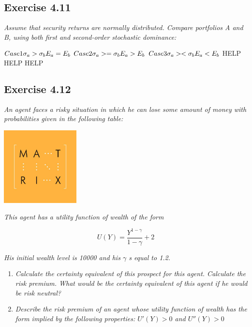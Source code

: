 \documentclass[]{book}
\theoremstyle{definition}
\theoremstyle{definition}
\theoremstyle{remark}
\begin{document}
\subsection{Exercise 4.11}\label{exercise-4.11}

\emph{Assume that security returns are normally distributed. Compare
portfolios A and B, using both first and second-order stochastic
dominance:} \citep[p.10]{exercises_danthine}

\(Case 1 \\ \sigma_a>\sigma_b \\ E_a=E_b\)
\(Case 2 \\ \sigma_a>=\sigma_b \\ E_a>E_b\)
\(Case 3 \\ \sigma_a><\sigma_b \\ E_a<E_b\) HELP HELP HELP

\subsection{Exercise 4.12}\label{exercise-4.12}

\emph{An agent faces a risky situation in which he can lose some amount
of money with probabilities given in the following table:}
\citep[p.10]{exercises_danthine}

\begin{center}\includegraphics[width=150px]{figures/matrix} \end{center}

\emph{This agent has a utility function of wealth of the form}
\citep[p.10]{exercises_danthine}

\[U\left(Y\right)=\frac{Y^{1-\gamma}}{1-\gamma}+2\]

\emph{His initial wealth level is 10000 and his \(\gamma\) s equal to
1.2.} \citep[p.10]{exercises_danthine}

\begin{enumerate}
\def\labelenumi{\alph{enumi}.}
\item
  \emph{Calculate the certainty equivalent of this prospect for this
  agent. Calculate the risk premium. What would be the certainty
  equivalent of this agent if he would be risk neutral?}
  \citep[p.10]{exercises_danthine}
\item
  \emph{Describe the risk premium of an agent whose utility function of
  wealth has the form implied by the following properties:
  \(U'\left(Y\right)>0\) and \(U''\left(Y\right)>0\)}
  \citep[p.10]{exercises_danthine}
\end{enumerate}
\end{document}

